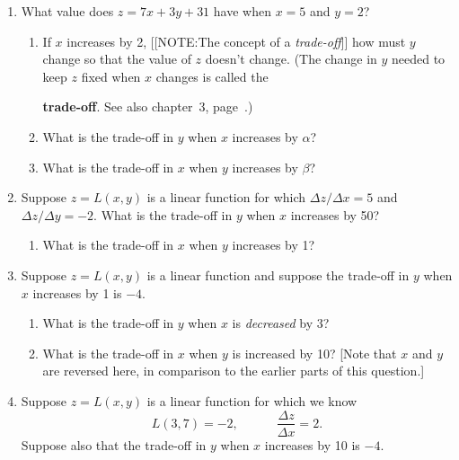 \begin{enumerate}
\begin{enumerate}


\end{enumerate}
\item What value does $z = 7x + 3 y + 31$ have when $x = 5$ and $y =
2$?

  \begin{enumerate}
  \item If $x$ increases by 2,
[[NOTE:The concept of   a {\em trade-off\/}]]
how must $y$ change so that the value of $z$ doesn't change.  (The
change in $y$ needed to keep $z$ fixed when $x$ changes is called the

{\bf trade-off}. See also chapter~3,
page~\pageref{trade off}.)


  \item What is the trade-off in $y$ when $x$ increases by $\alpha$?

  \item What is the trade-off in $x$ when $y$ increases by $\beta$?


\end{enumerate}
\item Suppose $z = L(x, y)$ is a linear function for which $\Delta
z/\Delta x = 5$ and $\Delta z/\Delta y = -2$.  What is the trade-off
in $y$ when $x$ increases by 50?

  \begin{enumerate}
  \item What is the trade-off in $x$ when $y$ increases by 1?


\end{enumerate}
\item Suppose $z = L(x, y)$ is a linear function and suppose the
trade-off in $y$ when $x$ increases by 1 is $-4$.

  \begin{enumerate}
  \item What is the trade-off in $y$ when $x$ is {\em decreased\/} by 3?

  \item What is the trade-off in $x$ when $y$ is increased by 10?  [Note
  that $x$ and $y$ are reversed here, in comparison to the earlier
  parts of this question.]


\end{enumerate}
\item Suppose $z = L(x, y)$ is a linear function for which we know
	\[
L(3, 7) = -2, \qquad \quad \dfrac{\Delta z}{\Delta x} = 2.
\]
Suppose also that the trade-off in $y$ when $x$ increases by 10 is $-4$.


\end{enumerate}
